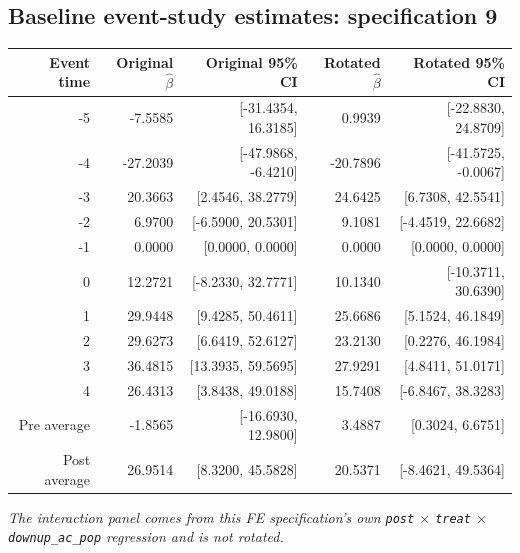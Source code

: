 \documentclass[10pt]{article}
\begin{document}
\subsection*{Baseline event-study estimates: specification 9}
\begin{center}
\scriptsize
\begin{tabular}{r rr rr}
\toprule
Event time & Original $\hat\beta$ & Original 95\% CI & Rotated $\hat\beta$ & Rotated 95\% CI \\
\midrule
-5 & -7.5585 & [-31.4354, 16.3185] & 0.9939 & [-22.8830, 24.8709] \\
-4 & -27.2039 & [-47.9868, -6.4210] & -20.7896 & [-41.5725, -0.0067] \\
-3 & 20.3663 & [2.4546, 38.2779] & 24.6425 & [6.7308, 42.5541] \\
-2 & 6.9700 & [-6.5900, 20.5301] & 9.1081 & [-4.4519, 22.6682] \\
-1 & 0.0000 & [0.0000, 0.0000] & 0.0000 & [0.0000, 0.0000] \\
0 & 12.2721 & [-8.2330, 32.7771] & 10.1340 & [-10.3711, 30.6390] \\
1 & 29.9448 & [9.4285, 50.4611] & 25.6686 & [5.1524, 46.1849] \\
2 & 29.6273 & [6.6419, 52.6127] & 23.2130 & [0.2276, 46.1984] \\
3 & 36.4815 & [13.3935, 59.5695] & 27.9291 & [4.8411, 51.0171] \\
4 & 26.4313 & [3.8438, 49.0188] & 15.7408 & [-6.8467, 38.3283] \\
\midrule
Pre average & -1.8565 & [-16.6930, 12.9800] & 3.4887 & [0.3024, 6.6751] \\
Post average & 26.9514 & [8.3200, 45.5828] & 20.5371 & [-8.4621, 49.5364] \\
\bottomrule
\end{tabular}
\end{center}
\medskip
\textit{The interaction panel comes from this FE specification's own \texttt{post} $\times$ \texttt{treat} $\times$ \texttt{downup\_ac\_pop} regression and is not rotated.}
\clearpage
\end{document}
